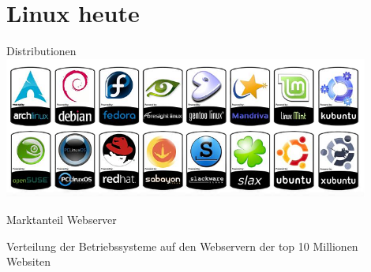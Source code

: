 \documentclass[10pt]{beamer}
\begin{document}


\section{Linux heute}

\begin{frame}{Distributionen}
    \centering
    \includegraphics[keepaspectratio,width=0.9\textwidth]{img/logos_2.png}
\end{frame}

\begin{frame}{Marktanteil Webserver}
    \begin{centering}
	\begin{bchart}[step=10,max=100]
			\smallskip
	\end{bchart}
\end{centering}
    
    Verteilung der Betriebssysteme auf den Webservern der top 10 Millionen Websiten
\end{frame}
\end{document}

